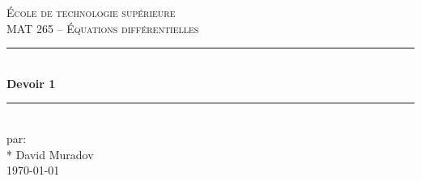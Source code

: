 \documentclass[11pt, letterpaper]{article}
\begin{document}
\begin{titlepage}
\center

\vspace*{2cm}

\textsc{\LARGE École de technologie supérieure}\\[1cm]
\textsc{\Large MAT 265 -- Équations différentielles}\\[1.5cm]

\rule{\linewidth}{0.5mm} \\[0.5cm]
{\LARGE \bfseries Devoir 1} \\[0.2cm]
\rule{\linewidth}{0.5mm} \\[3cm]

\large par: \\*
David Muradov\\[8cm]


{\large \today }\\[3cm]

\vfill
\end{titlepage}








\end{document}
